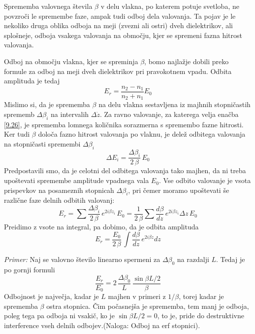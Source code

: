 Sprememba valovnega števila $\beta$ v delu vlakna, po katerem potuje
svetloba, ne povzroči le spremembe faze, ampak tudi odboj dela valovanja.
Ta pojav je le nekoliko druga oblika odboja na meji (zvezni ali ostri)
dveh dielektrikov, ali splošneje, odboja vsakega valovanja na območju,
kjer se spremeni fazna hitrost valovanja.

Odboj na območju vlakna, kjer se spreminja $\beta$, bomo najlažje
dobili preko formule za odboj na meji dveh dielektrikov pri pravokotnem
vpadu. Odbita amplituda je tedaj 
\begin{equation}
E_{r}=\frac{n_{2}-n_{1}}{n_{2}+n_{1}}E_{0}\label{9.26}
\end{equation}
 Mislimo si, da je sprememba $\beta$ na delu vlakna sestavljena iz
majhnih stopničastih sprememb $\Delta\beta_{i}$ na intervalih $\Delta\dot{z}$.
Za ravno valovanje, za katerega velja enačba \ref{9.26}, je sprememba
lomnega količnika sorazmerna s spremembo fazne hitrosti. Ker tudi
$\beta$ določa fazno hitrost valovanja po vlaknu, je delež odbitega
valovanja na stopničasti spremembi $\Delta\beta_{i}$
\begin{equation}
\Delta E_{i}=\frac{\Delta\beta_{i}}{2\,\beta}\, E_{0}\label{9.27}
\end{equation}
 Predpostavili smo, da je celotni del odbitega valovanja tako majhen,
da ni treba upoštevati spremembe amplitude vpadnega vala $E_{0}$.
Vse odbito valovanje je vsota prispevkov na posameznih stopnicah $\Delta\beta_{i}$,
pri čemer moramo upoštevati še različne faze delnih odbitih valovanj:
\begin{equation}
E_{r}=\sum\frac{\Delta\beta_{i}}{2\,\beta}\, e^{2i\beta z_{i}}\, E_{0}=\frac{1}{2\,\beta}\sum\frac{d\beta}{dz}\, e^{2i\beta z_{i}}\Delta z\, E_{0}\label{9.28}
\end{equation}
 Preidimo z vsote na integral, pa dobimo, da je odbita amplituda 
\begin{equation}
E_{r}=\frac{E_{0}}{2\,\beta}\,\int\frac{d\beta}{dz}\, e^{2i\beta z}dz\label{9.29}
\end{equation}


\textit{Primer:} Naj se valovno število linearno spermeni za $\Delta\beta_{0}$
na razdalji $L$. Tedaj je po gornji formuli 
\begin{equation}
\frac{E_{r}}{E_{0}}=2\,\frac{\Delta\beta_{0}}{L}\,\frac{\sin\beta L/2}{\beta}\label{9.30}
\end{equation}
 Odbojnost je največja, kadar je $L$ majhen v primeri z $1/\beta$,
torej kadar je sprememba $\beta$ ostra stopnica. Čim počasnejša je
sprememba, tem manj je odboja, poleg tega pa odboja ni vsakič, ko
je $\sin\beta L/2=0$, to je, pride do destruktivne interference vseh
delnih odbojev.(Naloga: Odboj na erf stopnici).


